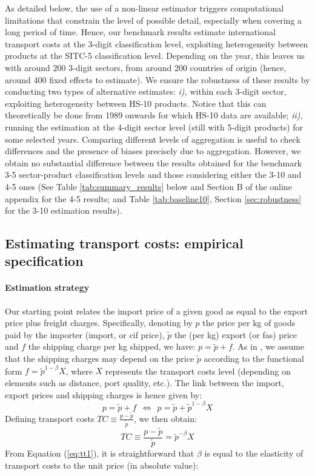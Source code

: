 \documentclass[a4paper,11pt]{article}
\begin{document}
As detailed below, the use of a non-linear estimator triggers computational limitations that constrain the level of possible detail, especially when covering a long period of time. Hence, our benchmark results estimate international transport costs at the 3-digit classification level, exploiting heterogeneity between products at the SITC-5 classification level. Depending on the year, this leaves us with around 200 3-digit sectors, from around 200 countries of origin (hence, around 400 fixed effects to estimate). We ensure the robustness of these results by conducting two types of alternative estimates: \textit{i),} within each 3-digit sector, exploiting heterogeneity between HS-10 products. Notice that this can theoretically be done from 1989 onwards for which HS-10 data are available; \textit{ii),} running the estimation at the 4-digit sector level (still with 5-digit products) for some selected years. Comparing different levels of aggregation is useful to check differences and the presence of biases precisely due to aggregation. However, we obtain no substantial difference between the results obtained for the benchmark 3-5 sector-product classification levels and those considering either the 3-10 and 4-5 ones (See Table \ref{tab:summary_results} below and Section B of the online appendix for the 4-5 results; and Table \ref{tab:baseline10}, Section \ref{sec:robustness} for the 3-10 estimation results).



\subsection{Estimating transport costs: empirical specification \label{sec:estimation_strat}}

\paragraph{Estimation strategy} Our starting point relates the import price of a given good as equal to the export price plus freight charges. Specifically, denoting by $p$ the price per kg of goods paid by the importer (import, or cif price), $\widetilde{p}$ the (per kg) export (or fas) price and $f$ the shipping charge per kg shipped, we have: $ p = \widetilde{p} +f$. As in \cite{hummels2010}, we assume that the shipping charges may depend on the price $\widetilde{p}$ according to the functional form $f = \widetilde{p}^{1-\beta} X$, where $X$ represents the transport costs level (depending on elements such as distance, port quality, etc.). The link between the import, export prices and shipping charges is hence given by:
$$ p = \widetilde{p}+f ~~ \Leftrightarrow  ~~ p = \widetilde{p}+\widetilde{p}^{1-\beta} X $$
Defining transport costs $TC \equiv \frac{p-\widetilde{p}}{\widetilde{p}}$, we then obtain:
\begin{equation}
TC \equiv \frac{p-\widetilde{p}}{\widetilde{p}} = \widetilde{p}^{-\beta} X \label{eq:tt1}
\end{equation}
From Equation (\ref{eq:tt1}), it is straightforward that $\beta$ is equal to the elasticity of transport costs to the unit price (in absolute value):
\end{document}
